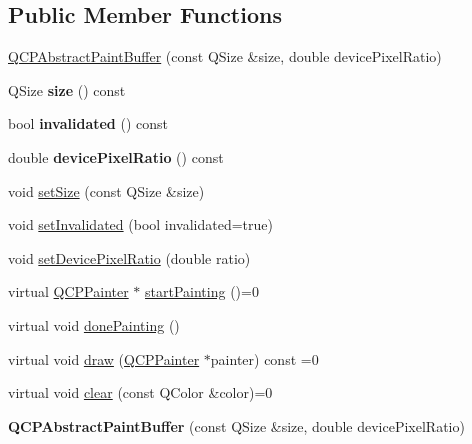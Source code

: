 \subsection*{Public Member Functions}
\begin{DoxyCompactItemize}
\item 
\hyperlink{class_q_c_p_abstract_paint_buffer_a3ce532c12f10b81697108835755641e2}{Q\+C\+P\+Abstract\+Paint\+Buffer} (const Q\+Size \&size, double device\+Pixel\+Ratio)
\item 
Q\+Size {\bfseries size} () const \hypertarget{class_q_c_p_abstract_paint_buffer_aad79fd72221e4614a771c03985798d9b}{}\label{class_q_c_p_abstract_paint_buffer_aad79fd72221e4614a771c03985798d9b}

\item 
bool {\bfseries invalidated} () const \hypertarget{class_q_c_p_abstract_paint_buffer_a4b8de01a2485c2bf8e98fdbec7f0bcc6}{}\label{class_q_c_p_abstract_paint_buffer_a4b8de01a2485c2bf8e98fdbec7f0bcc6}

\item 
double {\bfseries device\+Pixel\+Ratio} () const \hypertarget{class_q_c_p_abstract_paint_buffer_a107d55bb234b5d19651157071d3b2c37}{}\label{class_q_c_p_abstract_paint_buffer_a107d55bb234b5d19651157071d3b2c37}

\item 
void \hyperlink{class_q_c_p_abstract_paint_buffer_a8b68c3cd36533f1a4a23b5ce8cd66f01}{set\+Size} (const Q\+Size \&size)
\item 
void \hyperlink{class_q_c_p_abstract_paint_buffer_ae4c7dc70dfc66be2879ce297b2b3d67f}{set\+Invalidated} (bool invalidated=true)
\item 
void \hyperlink{class_q_c_p_abstract_paint_buffer_a555eaad5d5c806420ff35602a1bb68fa}{set\+Device\+Pixel\+Ratio} (double ratio)
\item 
virtual \hyperlink{class_q_c_p_painter}{Q\+C\+P\+Painter} $\ast$ \hyperlink{class_q_c_p_abstract_paint_buffer_a9e9f29b19c033cf02fb96f1a148463f3}{start\+Painting} ()=0
\item 
virtual void \hyperlink{class_q_c_p_abstract_paint_buffer_a41b0dc6e7744f19fae09f8532c207dc1}{done\+Painting} ()
\item 
virtual void \hyperlink{class_q_c_p_abstract_paint_buffer_afb998c7525e3ae37d9d2d46c7aaf461a}{draw} (\hyperlink{class_q_c_p_painter}{Q\+C\+P\+Painter} $\ast$painter) const =0
\item 
virtual void \hyperlink{class_q_c_p_abstract_paint_buffer_a9e253f4541dfc01992b77e8830bd7722}{clear} (const Q\+Color \&color)=0
\item 
{\bfseries Q\+C\+P\+Abstract\+Paint\+Buffer} (const Q\+Size \&size, double device\+Pixel\+Ratio)\hypertarget{class_q_c_p_abstract_paint_buffer_a3ce532c12f10b81697108835755641e2}{}\label{class_q_c_p_abstract_paint_buffer_a3ce532c12f10b81697108835755641e2}


\end{DoxyCompactItemize}
